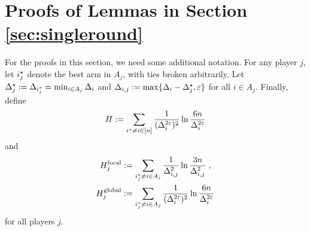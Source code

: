 \documentclass{article}
\gdef\isconf{1}
\begin{document}





%












\ifdefined\isconf
\else

\newpage
\appendix

\section{Proofs of Lemmas in Section \ref{sec:singleround}}

For the proofs in this section, we need some additional notation.
For any player $j$, let $i^\star_j$ denote the best arm in $A_j$, with ties broken arbitrarily. 
Let $\Delta^\star_j := \Delta_{i^\star_j} = \min_{i \in A_j} \Delta_i$ and $\Delta_{i,j} := \max\{ \Delta_i - \Delta_j^\star, \varepsilon \}$ for all $i \in A_j$.
Finally, define
\begin{align*}
	H
	:= \sum_{i^\star \ne i \in [n]}
		\frac{1}{(\Delta_i^{2\varepsilon})^2} \ln \frac{6n}{\Delta_i^{2\varepsilon}}
\end{align*}
and
\begin{align*}
	H_j^{\text{local}}
	&:= \sum_{i^\star_j \ne i \in A_j}
		\frac{1}{\Delta_{i,j}^2} \ln \frac{3n}{\Delta_{i,j}^2}
	\;,\\
	H_j^{\text{global}}
	&:= \sum_{i^\star_j \ne i \in A_j}
		\frac{1}{(\Delta_i^{2\varepsilon})^2} \ln \frac{6n}{\Delta_i^{2\varepsilon}}
\end{align*}
for all players $j$.
\end{document}
